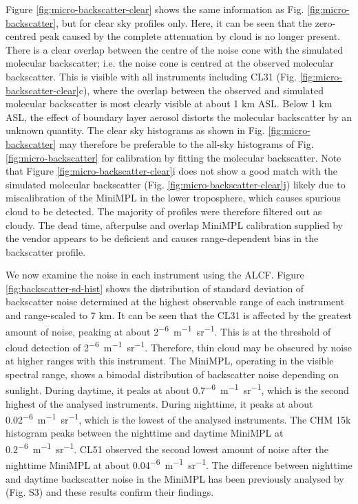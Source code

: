 Figure \ref{fig:micro-backscatter-clear} shows the same information as Fig. \ref{fig:micro-backscatter},
but for clear sky profiles only. Here, it can be seen that the zero-centred
peak caused by the complete attenuation by cloud is no longer present.
There is a clear overlap between the centre of the noise cone
with the simulated molecular backscatter; i.e. the noise cone is centred
at the observed molecular backscatter. This is visible with all instruments
including CL31 (Fig. \ref{fig:micro-backscatter-clear}c), where the overlap between
the observed and simulated molecular backscatter is most clearly visible at about 1 km ASL.
Below 1 km ASL,
the effect of boundary layer aerosol distorts the molecular backscatter
by an unknown quantity. The clear sky histograms as shown in Fig.
\ref{fig:micro-backscatter} may therefore be preferable to the all-sky
histograms of Fig. \ref{fig:micro-backscatter} for calibration by fitting 
the molecular backscatter. Note that Figure \ref{fig:micro-backscatter-clear}i
does not show a good match with the simulated molecular backscatter (Fig. \ref{fig:micro-backscatter-clear}j)
likely due to miscalibration of the MiniMPL in the lower troposphere,
which causes spurious cloud to be detected. The majority of profiles were therefore
filtered out as cloudy. The dead time, afterpulse and overlap MiniMPL
calibration supplied by the vendor appears to be deficient and causes
range-dependent bias in the backscatter profile.

We now examine the noise in each instrument using the ALCF.
Figure \ref{fig:backscatter-sd-hist} shows the distribution of standard
deviation of backscatter noise determined at the highest observable range of each instrument
and range-scaled
to 7 km. It can be seen that the CL31 is affected by the greatest amount of noise,
peaking at about 2\unit{^{-6}m^{-1}sr^{-1}}. This is at the
threshold of cloud detection of 2\unit{^{-6}m^{-1}sr^{-1}}. Therefore,
thin cloud may be obscured by noise at higher ranges with this instrument. The MiniMPL,
operating in the visible spectral range, shows a bimodal distribution of
backscatter noise depending on sunlight. During daytime, it peaks at
about 0.7\unit{^{-6}m^{-1}sr^{-1}}, which is the second highest
of the analysed instruments. During nighttime, it peaks at about
0.02\unit{^{-6}m^{-1}sr^{-1}}, which is the lowest of the analysed
instruments. The CHM 15k histogram peaks between the nighttime and daytime MiniMPL at 0.2\unit{^{-6}m^{-1}sr^{-1}}.
CL51 observed the second lowest amount
of noise after the nighttime MiniMPL at about 0.04\unit{^{-6}m^{-1}sr^{-1}}.
The difference between nighttime and daytime backscatter noise in the MiniMPL
has been previously analysed by \cite{silber2018} (Fig. S3) and these results confirm their findings.

